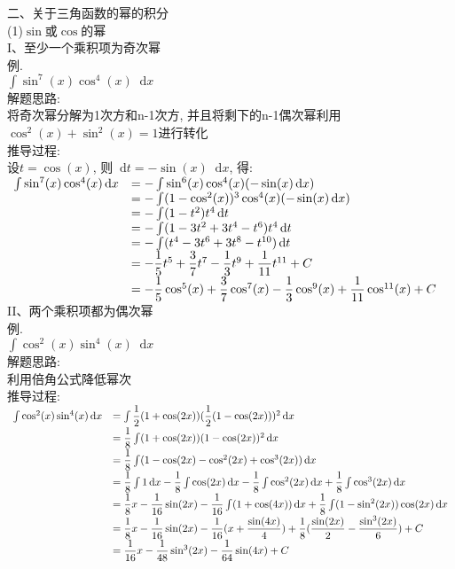 \documentclass[UTF8, fontset=ubuntu, fleqn, fleqn]{ctexart}
\newcommand*{\dif}{\mathop{}\!\mathrm{d}}
\begin{document}
二、关于三角函数的幂的积分\\
(1)$\sin$或$\cos$的幂\\
I、至少一个乘积项为奇次幂\\
例.\\
$\int\sin^7(x)\cos^4(x)\dif x$\\
解题思路:\\
将奇次幂分解为1次方和n-1次方, 并且将剩下的n-1偶次幂利用$\cos^2(x)+\sin^2(x)=1$进行转化\\
推导过程:\\
设$t=\cos(x)$, 则$\dif t=-\sin(x)\dif x$, 得:\\
\(\begin{array}{r l}
\int\sin^7(x)\cos^4(x)\dif x & =-\int\sin^6(x)\cos^4(x)(-\sin(x)\dif x)\\
& =-\int(1-\cos^2(x))^3\cos^4(x)(-\sin(x)\dif x)\\
& =-\int(1-t^2)t^4\dif t\\
& =-\int(1-3t^2+3t^4-t^6)t^4\dif t\\
& =-\int(t^4-3t^6+3t^8-t^{10})\dif t\\
& =-\dfrac{1}{5}t^5+\dfrac{3}{7}t^7-\dfrac{1}{3}t^9+\dfrac{1}{11}t^{11}+C\\[1ex]
& =-\dfrac{1}{5}\cos^5(x)+\dfrac{3}{7}\cos^7(x)-\dfrac{1}{3}\cos^9(x)+\dfrac{1}{11}\cos^{11}(x)+C
\end{array}\)\\[2ex]

II、两个乘积项都为偶次幂\\
例.\\
$\int\cos^2(x)\sin^4(x)\dif x$\\
解题思路:\\
利用倍角公式降低幂次\\
推导过程:\\
\(\begin{array}{r l}
\int\cos^2(x)\sin^4(x)\dif x & =\int\dfrac{1}{2}(1+\cos(2x))(\dfrac{1}{2}(1-\cos(2x)))^2\dif x\\[1ex]
& =\dfrac{1}{8}\int(1+\cos(2x))(1-\cos(2x))^2\dif x\\[1ex]
& =\dfrac{1}{8}\int(1-\cos(2x)-\cos^2(2x)+\cos^3(2x))\dif x\\[1ex]
& =\dfrac{1}{8}\int 1\dif x-\dfrac{1}{8}\int\cos(2x)\dif x-\dfrac{1}{8}\int\cos^2(2x)\dif x+\dfrac{1}{8}\int\cos^3(2x)\dif x\\[1ex]
& =\dfrac{1}{8}x-\dfrac{1}{16}\sin(2x)-\dfrac{1}{16}\int(1+\cos(4x))\dif x+\dfrac{1}{8}\int(1-\sin^2(2x))\cos(2x)\dif x\\[1ex]
& =\dfrac{1}{8}x-\dfrac{1}{16}\sin(2x)-\dfrac{1}{16}(x+\dfrac{\sin(4x)}{4})+\dfrac{1}{8}(\dfrac{\sin(2x)}{2}-\dfrac{\sin^3(2x)}{6})+C\\[1ex]
& =\dfrac{1}{16}x-\dfrac{1}{48}\sin^3(2x)-\dfrac{1}{64}\sin(4x)+C
\end{array}\)\\[2ex]
\end{document}
